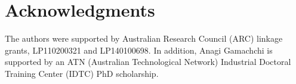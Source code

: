 \documentclass[conference,draftclsnofoot,onecolumn]{IEEEtran}%
\begin{document}
\section*{Acknowledgments}

The authors were supported by  Australian Research Council (ARC) linkage grants, LP110200321 and LP140100698. In addition, Anagi Gamachchi is supported by an ATN (Australian Technological Network) Industrial Doctoral Training Center (IDTC) PhD scholarship.




\end{document}
